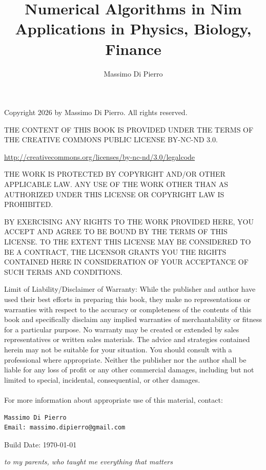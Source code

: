 \documentclass[justified, sixbynine]{tufte-book}
\title[Numerical Algorithms in Nim]{\LARGE Numerical Algorithms in Nim\\[0.5em]
       \large Applications in Physics, Biology, Finance}
\author{Massimo Di Pierro}
\theoremstyle{plain}%
\newtheorem * {corollary}{Corollary}
\theoremstyle{definition}
\theoremstyle{remark}
\newtheorem * {remark}{Remark}
\newtheorem * {note}{Note}
\begin{document}
\frontmatter

\maketitle

\thispagestyle{empty}
\setlength{\parindent}{0pt}
\setlength{\parskip}{2mm}
{\footnotesize
\vskip 1in
Copyright 2026 by Massimo Di Pierro. All rights reserved.
\vskip 1cm

THE CONTENT OF THIS BOOK IS PROVIDED UNDER THE TERMS OF THE CREATIVE COMMONS PUBLIC LICENSE BY-NC-ND 3.0.

\url{http://creativecommons.org/licenses/by-nc-nd/3.0/legalcode}

THE WORK IS PROTECTED BY COPYRIGHT AND/OR OTHER APPLICABLE LAW. ANY USE OF THE WORK OTHER THAN AS AUTHORIZED UNDER THIS LICENSE OR COPYRIGHT LAW IS PROHIBITED.

BY EXERCISING ANY RIGHTS TO THE WORK PROVIDED HERE, YOU ACCEPT AND AGREE TO BE BOUND BY THE TERMS OF THIS LICENSE. TO THE EXTENT THIS LICENSE MAY BE CONSIDERED TO BE A CONTRACT, THE LICENSOR GRANTS YOU THE RIGHTS CONTAINED HERE IN CONSIDERATION OF YOUR ACCEPTANCE OF SUCH TERMS AND CONDITIONS.

Limit of Liability/Disclaimer of Warranty: While the publisher and
author have used their best efforts in preparing this book, they
make no representations or warranties with respect to the accuracy
or completeness of the contents of this book and specifically
disclaim any implied warranties of merchantability or fitness for a
particular purpose.  No warranty may be created or extended by
sales representatives or written sales materials.
The advice and strategies contained herein may not be
suitable for your situation. You should consult with a professional
where appropriate.  Neither the publisher nor the author shall be liable
for any loss of profit or any other commercial damages, including
but not limited to special, incidental, consequential, or other damages. \\ \\

For more information about appropriate use of this material, contact:

\begin{verbatim}
Massimo Di Pierro
Email: massimo.dipierro@gmail.com
\end{verbatim}

Build Date: \today
}

\newpage
\thispagestyle{empty}
\phantom{placeholder}
\vspace{2in}
\begin{flushright}
{\it to my parents, who taught me everything that matters}
\end{flushright}
\newpage
\thispagestyle{empty}
\phantom {a}
\newpage
\end{document}
